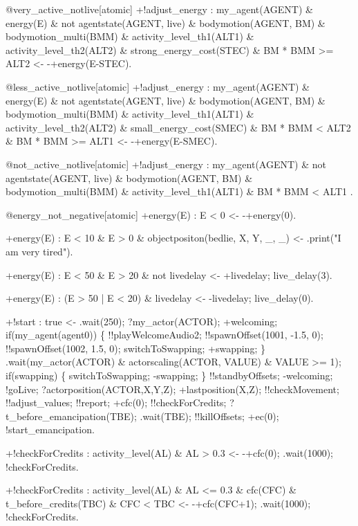 \documentclass[draft,final]{vutinfth} %
\begin{document}
{@very\_active\_notlive[atomic]
+!adjust\_energy : my\_agent(AGENT) \& energy(E) \& not agentstate(AGENT, live) \& bodymotion(AGENT, BM) \& bodymotion\_multi(BMM)
    \& activity\_level\_th1(ALT1) \& activity\_level\_th2(ALT2) \& strong\_energy\_cost(STEC) \& BM * BMM >= ALT2
    <-  -+energy(E-STEC).

@less\_active\_notlive[atomic]
+!adjust\_energy : my\_agent(AGENT) \& energy(E) \& not agentstate(AGENT, live) \& bodymotion(AGENT, BM) \& bodymotion\_multi(BMM)
    \& activity\_level\_th1(ALT1) \& activity\_level\_th2(ALT2) \& small\_energy\_cost(SMEC) \& BM * BMM < ALT2 \& BM * BMM >= ALT1
    <-  -+energy(E-SMEC).

@not\_active\_notlive[atomic]
+!adjust\_energy : my\_agent(AGENT) \& not agentstate(AGENT, live) \& bodymotion(AGENT, BM) \& bodymotion\_multi(BMM)
    \& activity\_level\_th1(ALT1) \& BM * BMM < ALT1 .

@energy\_not\_negative[atomic]
+energy(E) : E < 0
    <- -+energy(0).

+energy(E) : E < 10 \& E > 0 \& objectpositon(bedlie, X, Y, \_, \_)
    <-  .print("I am very tired").

+energy(E) : E < 50 \& E > 20 \& not livedelay
    <-  +livedelay;
        live\_delay(3).

+energy(E) : (E > 50 | E < 20) \& livedelay
    <-  -livedelay;
        live\_delay(0).

+!start : true
    <-  .wait(250);
        ?my\_actor(ACTOR);
        +welcoming;
        if(my\_agent(agent0))
        \{
            !!playWelcomeAudio2;
            !!spawnOffset(1001, -1.5, 0);
            !!spawnOffset(1002, 1.5, 0);
            switchToSwapping;
            +swapping;
        \}
        .wait(my\_actor(ACTOR) \& actorscaling(ACTOR, VALUE) \& VALUE >= 1);
        if(swapping)
        \{
            switchToSwapping;
            -swapping;
        \}
        !!standbyOffsets;
        -welcoming;
        !goLive;
        ?actorposition(ACTOR,X,Y,Z);
        +lastposition(X,Z);
        !!checkMovement;
        !!adjust\_values;
        !!report;
        +cfc(0);
        !!checkForCredits;
        ?t\_before\_emancipation(TBE);
        .wait(TBE);
        !!killOffsets;
        +ec(0);
        !start\_emancipation.

+!checkForCredits : activity\_level(AL) \& AL > 0.3
    <-  -+cfc(0);
        .wait(1000);
        !checkForCredits.

+!checkForCredits : activity\_level(AL) \& AL <= 0.3 \& cfc(CFC) \& t\_before\_credits(TBC) \& CFC < TBC
    <-  -+cfc(CFC+1);
        .wait(1000);
        !checkForCredits.

}
\end{document}
